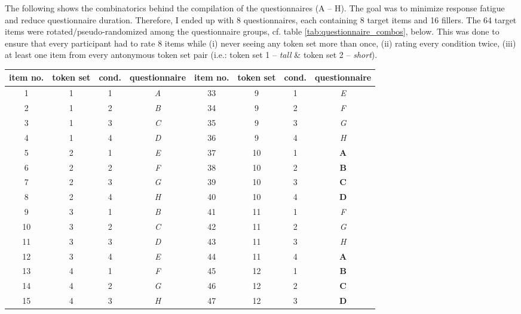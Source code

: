 \documentclass[output=paper,
modfonts
]{langscibook}
\begin{document}
\noindent The following shows the combinatorics behind the compilation of the questionnaires (A -- H). The goal was to minimize response fatigue and reduce questionnaire duration. Therefore, I ended up with 8 questionnaires, each containing 8 target items and 16 fillers. The 64 target items were rotated/pseudo-randomized among the questionnaire groups, cf. table \ref{tab:questionnaire_combos}, below. This was done to ensure that every participant had to rate 8 items while (i) never seeing any token set more than once, (ii) rating every condition twice, (iii) at least one item from every antonymous token set pair (i.e.: token set 1 -- \textit{tall} \& token set 2 -- \textit{short}).

\begin{table}[H]\scriptsize
\begin{tabular}{cccc|cccc}
\lsptoprule
item no. & token set & cond. & \textbf{questionnaire} & item no. & token set & cond. & \textbf{questionnaire} \\
\midrule \midrule 
1  & 1 & 1 & \textit{A}     & 33 & 9 & 1 & \textit{E}\\
\midrule 
2  & 1 & 2 & \textit{B}     & 34 & 9 & 2 & \textit{F} \\
\midrule
3  & 1 & 3 & \textit{C}     & 35 & 9 & 3 & \textit{G} \\
\midrule
4  & 1 & 4 & \textit{D}     & 36 & 9 & 4 & \textit{H} \\
\midrule
5  & 2 & 1 & \textit{E}     & 37 & 10 & 1 & \textbf{A} \\
\midrule
6  & 2 & 2 & \textit{F}     & 38 & 10 & 2 & \textbf{B} \\
\midrule
7  & 2 & 3 & \textit{G}     & 39 & 10 & 3 & \textbf{C} \\
\midrule
8  & 2 & 4 & \textit{H}     & 40 & 10 & 4 & \textbf{D} \\
\midrule \midrule
9  & 3 & 1 & \textit{B}     & 41 & 11 & 1 & \textit{F} \\
\midrule
10  & 3 & 2 & \textit{C}    & 42 & 11 & 2 & \textit{G} \\
\midrule
11  & 3 & 3 & \textit{D}    & 43 & 11 & 3 & \textit{H} \\
\midrule
12  & 3 & 4 & \textit{E}    & 44 & 11 & 4 & \textbf{A} \\
\midrule
13  & 4 & 1 & \textit{F}    & 45 & 12 & 1 & \textbf{B} \\
\midrule
14  & 4 & 2 & \textit{G}    & 46 & 12 & 2 & \textbf{C} \\
\midrule
15  & 4 & 3 & \textit{H}    & 47 & 12 & 3 & \textbf{D} \\

\end{tabular}
\end{table}
\end{document}
